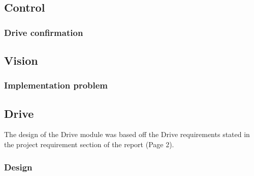 \documentclass[11pt, a4paper]{article}
\begin{document}
\pagebreak
\subsection{Control}







\subsubsection{Drive confirmation}



\pagebreak
\subsection{Vision}



\subsubsection{Implementation problem}


\pagebreak
\subsection{Drive}
The design of the Drive module was based off the Drive requirements stated in the project requirement section of the report (Page 2). 

\subsubsection{Design}
\end{document}
